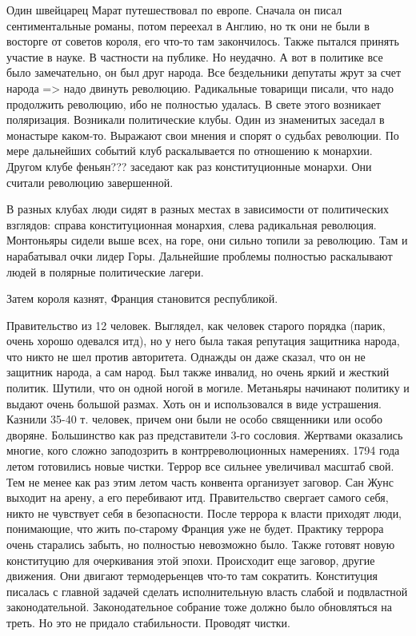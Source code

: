 \documentclass[a4paper, 12pt]{article}
\begin{document}
\begin{multicols}{2}
Один швейцарец Марат путешествовал по европе. Сначала он писал сентиментальные романы, потом переехал в Англию, но тк они не были в восторге от советов короля, его что-то там закончилось. Также пытался принять участие в науке. В частности на публике. Но неудачно. А вот в политике все было замечательно, он был друг народа. Все бездельники депутаты жрут за счет народа => надо двинуть революцию. Радикальные товарищи писали, что надо продолжить революцию, ибо не полностью удалась. В свете этого возникает поляризация. Возникали политические клубы. Один из знаменитых заседал в монастыре каком-то. Выражают свои мнения и спорят о судьбах революции. По мере дальнейших событий клуб раскалывается по отношению к монархии. Другом клубе феньян??? заседают как раз конституционные монархи. Они считали революцию завершенной. 

В разных клубах люди сидят в разных местах в зависимости от политических взглядов: справа конституционная монархия, слева радикальная революция. Монтоньяры сидели выше всех, на горе, они сильно топили за революцию. Там и нарабатывал очки лидер Горы. Дальнейшие проблемы полностью раскалывают людей в полярные политические лагери. 

Затем короля казнят, Франция становится республикой. 

Правительство из 12 человек. Выглядел, как человек старого порядка (парик, очень хорошо одевался итд), но у него была такая репутация защитника народа, что никто не шел против авторитета. Однажды он даже сказал, что он не защитник народа, а сам народ. Был также инвалид, но очень яркий и жесткий политик. Шутили, что он одной ногой в могиле. Метаньяры начинают политику и выдают очень большой размах. Хоть он и использовался в виде устрашения. Казнили 35-40 т. человек, причем они были не особо священники или особо дворяне. Большинство как раз представители 3-го сословия. Жертвами оказались многие, кого сложно заподозрить в контрреволюционных намерениях. 1794 года летом готовились новые чистки. Террор все сильнее увеличивал масштаб свой. Тем не менее как раз этим летом часть конвента организует заговор. Сан Жунс выходит на арену, а его перебивают итд. Правительство свергает самого себя, никто не чувствует себя в безопасности. После террора к власти приходят люди, понимающие, что жить по-старому Франция уже не будет. Практику террора очень старались забыть, но полностью невозможно было. Также готовят новую конституцию для очеркивания этой эпохи. Происходит еще заговор, другие движения. Они двигают термодерьенцев что-то там сократить. Конституция писалась с главной задачей сделать исполнительную власть слабой и подвластной законодательной. Законодательное собрание тоже должно было обновляться на треть. Но это не придало стабильности. Проводят чистки. 


\end{multicols}
\end{document}
